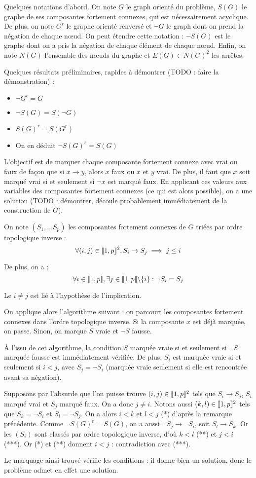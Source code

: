 Quelques notations d'abord. On note $G$ le graph orienté du problème, $S(G)$ le
graphe de ses composantes fortement connexes, qui est nécessairement acyclique.
De plus, on note $G^r$ le graphe orienté renversé et $\neg G$ le graph dont on
prend la négation de chaque nœud. On peut étendre cette notation : $\neg S(G)$
est le graphe dont on a pris la négation de chaque élément de chaque nœud.
Enfin, on note $N(G)$ l'ensemble des nœuds du graphe et $E(G) \in N(G)^2$ les
arrêtes.

Quelques résultats préliminaires, rapides à démontrer (TODO : faire la
démonstration) : \begin{itemize}
 \item $\neg G^r = G$
 \item $\neg S(G) = S(\neg G)$
 \item $S(G)^r = S(G^r)$
 \item On en déduit $\neg S(G)^r = S(G)$
\end{itemize}

L'objectif est de marquer chaque composante fortement connexe avec vrai ou faux
de façon que si $x \rightarrow y$, alors $x$ faux ou $x$ et $y$ vrai. De plus,
il faut que $x$ soit marqué vrai si et seulement si $\neg x$ est marqué faux.
En applicant ces valeurs aux variables des composantes fortement connexes
(ce qui est alors possible), on a une solution (TODO : démontrer, découle
probablement immédiatement de la construction de $G$).

On note $(S_1,\ldots S_p)$ les composantes fortement connexes de $G$ triées par
ordre topologique inverse :
    \[ \forall (i,j)\in\llbracket 1, p \rrbracket^2, S_i \rightarrow S_j \implies j \leq i \]

De plus, on a :
    \[ \forall i\in\llbracket 1, p \rrbracket, \exists j\in\llbracket 1, p \rrbracket\backslash\{i\}: \neg S_i = S_j \]

Le $i\neq j$ est lié à l'hypothèse de l'implication.

On applique alors l'algorithme suivant : on parcourt les composantes fortement
connexes dans l'ordre topologique inverse. Si la composante $x$ est déjà
marquée, on passe. Sinon, on marque $S$ vraie et $\neg S$ fausse.

À l'issu de cet algorithme, la condition $S$ marquée vraie si et seulement si
$\neg S$ marquée fausse est immédiatement vérifiée. De plus, $S_i$ est marquée
vraie si et seulement si $i < j$, avec $S_j = \neg S_i$ (marquée vraie
seulement si elle est rencontrée avant sa négation).

Supposons par l'absurde que l'on puisse trouve $(i,j)\in\llbracket 1, p \rrbracket^2$ tels que
$S_i\rightarrow S_j$, $S_i$ marqué vrai et $S_j$ marqué faux. On a donc
$j \neq i$. Notons aussi $(k,l)\in\llbracket 1, p \rrbracket^2$ tels que $S_k = \neg S_i$ et
$S_l = \neg S_j$. On a alors $i < k$ et $l < j$ (*) d'après la remarque
précédente. Comme $\neg S(G)^r = S(G)$, on a aussi $\neg S_j\rightarrow \neg S_i$,
soit $S_l\rightarrow S_k$. Or les $(S_i)$ sont classés par ordre topologique
inverse, d'où $k < l$ (**) et $j < i$ (***). Or (*) et (**) donnent $i < j$ :
contradiction avec (***).

Le marquage ainsi trouvé vérifie les conditions : il donne bien un solution,
donc le problème admet en effet une solution.

